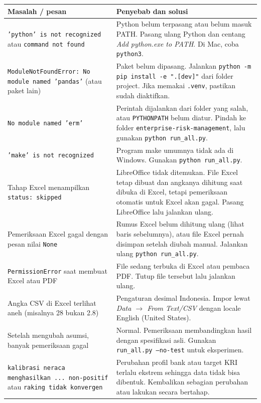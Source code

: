 \documentclass[11pt,a4paper]{article}
\newcommand{\file}[1]{\texttt{\small #1}}
\begin{document}
\begin{longtable}{>{\raggedright\arraybackslash}p{5.6cm}>{\raggedright\arraybackslash}p{9.2cm}}
\toprule
\textbf{Masalah / pesan} & \textbf{Penyebab dan solusi} \\
\midrule
\endhead
\texttt{'python' is not recognized} atau \texttt{command not found} & Python belum terpasang atau belum masuk PATH. Pasang ulang Python dan centang \emph{Add python.exe to PATH}. Di Mac, coba \texttt{python3}. \\
\addlinespace[2pt]
\texttt{ModuleNotFoundError: No module named 'pandas'} (atau paket lain) & Paket belum dipasang. Jalankan \texttt{python -m pip install -e ".[dev]"} dari folder project. Jika memakai \texttt{.venv}, pastikan sudah diaktifkan. \\
\addlinespace[2pt]
\texttt{No module named 'erm'} & Perintah dijalankan dari folder yang salah, atau \texttt{PYTHONPATH} belum diatur. Pindah ke folder \file{enterprise-risk-management}, lalu gunakan \texttt{python run\_\allowbreak{}all.py}. \\
\addlinespace[2pt]
\texttt{'make' is not recognized} & Program make umumnya tidak ada di Windows. Gunakan \texttt{python run\_\allowbreak{}all.py}. \\
\addlinespace[2pt]
Tahap Excel menampilkan \texttt{status: skipped} & LibreOffice tidak ditemukan. File Excel tetap dibuat dan angkanya dihitung saat dibuka di Excel, tetapi pemeriksaan otomatis untuk Excel akan gagal. Pasang LibreOffice lalu jalankan ulang. \\
\addlinespace[2pt]
Pemeriksaan Excel gagal dengan pesan nilai \texttt{None} & Rumus Excel belum dihitung ulang (lihat baris sebelumnya), atau file Excel pernah disimpan setelah diubah manual. Jalankan ulang \texttt{python run\_\allowbreak{}all.py}. \\
\addlinespace[2pt]
\texttt{PermissionError} saat membuat Excel atau PDF & File sedang terbuka di Excel atau pembaca PDF. Tutup file tersebut lalu jalankan ulang. \\
\addlinespace[2pt]
Angka CSV di Excel terlihat aneh (misalnya 28 bukan 2.8) & Pengaturan desimal Indonesia. Impor lewat \emph{Data $\rightarrow$ From Text/CSV} dengan locale English (United States). \\
\addlinespace[2pt]
Setelah mengubah asumsi, banyak pemeriksaan gagal & Normal. Pemeriksaan membandingkan hasil dengan spesifikasi asli. Gunakan \texttt{run\_\allowbreak{}all.py --no-test} untuk eksperimen. \\
\addlinespace[2pt]
\texttt{kalibrasi neraca menghasilkan ... non-positif} atau \texttt{raking tidak konvergen} & Perubahan profil bank atau target KRI terlalu ekstrem sehingga data tidak bisa dibentuk. Kembalikan sebagian perubahan atau lakukan secara bertahap. \\

\end{longtable}
\end{document}
